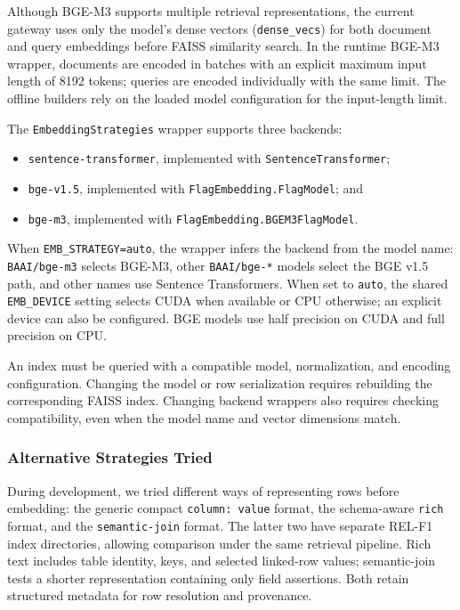 \documentclass[11pt,a4paper]{article}
\newcommand{\code}[1]{\texttt{#1}}
\begin{document}
Although BGE-M3 supports multiple retrieval representations, the current gateway
uses only the model's dense vectors (\code{dense\_vecs}) for both document and
query embeddings before FAISS similarity search. In the runtime BGE-M3 wrapper, documents are encoded in batches
with an explicit maximum input length of 8192 tokens; queries are encoded
individually with the same limit. The offline builders rely on the loaded
model configuration for the input-length limit.

The \code{EmbeddingStrategies} wrapper supports three backends:

\begin{itemize}
  \item \code{sentence-transformer}, implemented with \code{SentenceTransformer};
  \item \code{bge-v1.5}, implemented with \code{FlagEmbedding.FlagModel}; and
  \item \code{bge-m3}, implemented with \code{FlagEmbedding.BGEM3FlagModel}.
\end{itemize}

When \code{EMB\_STRATEGY=auto}, the wrapper infers the backend from the model
name: \code{BAAI/bge-m3} selects BGE-M3, other \code{BAAI/bge-*} models select
the BGE v1.5 path, and other names use Sentence Transformers. When set to \code{auto}, the shared
\code{EMB\_DEVICE} setting selects CUDA when available or CPU otherwise; an
explicit device can also be configured. BGE
models use half precision on CUDA and full precision on CPU.

An index must be queried with a compatible model, normalization, and encoding
configuration. Changing the model or row serialization requires rebuilding the
corresponding FAISS index. Changing backend wrappers also requires checking
compatibility, even when the model name and vector dimensions match.

\subsubsection{Alternative Strategies Tried}

During development, we tried different ways of representing rows before
embedding: the generic compact \code{column: value} format, the schema-aware
\code{rich} format, and the \code{semantic-join} format. The latter two have
separate REL-F1 index directories, allowing comparison under the same retrieval
pipeline. Rich text includes table identity, keys, and selected linked-row
values; semantic-join tests a shorter representation containing only field
assertions. Both retain structured metadata for row resolution and provenance.
\end{document}
